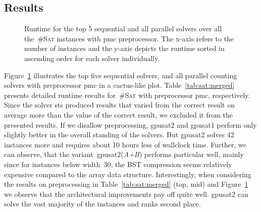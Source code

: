 \documentclass{llncs}
\newcommand{\cSAT}{\textsc{\#Sat}\xspace}%
\newcommand{\gpusatnu}{{\small\textsf{gpusat2}}\xspace}
\newcommand{\gpusatnuv}[1]{{\small\textsf{gpusat2({\textit{#1}})}}\xspace}
\newcommand{\gpusatone}{{\small\textsf{gpusat1}}\xspace}
\begin{document}
\subsection{Results} %
%
%
%
%
%
%
%
%
%
%


\begin{figure}[t]
  \centering
  \caption{Runtime for the top 5 sequential and all parallel solvers over all the~\cSAT instances with pmc preprocessor. %
    The x-axis refers to the number of instances and the y-axis
    depicts the runtime sorted in ascending order for each solver
    individually.  }
  \label{fig:runtime}
\end{figure}
%
Figure~\ref{fig:runtime} illustrates the top five sequential solvers,
and all parallel counting solvers %
%
with preprocessor pmc %
%
in a cactus-like plot. 
Table~\ref{tab:sat:merged} presents detailed runtime
results for~\cSAT with preprocessor pmc, respectively. %
%
%
%
%
%
%
%
%
%
%
%
%
%
%
%
%
Since the solver sts produced results that varied from the correct
result on average more than the value of the correct result, %
%
%
%
%
%
we excluded it from the presented results.  If we disallow
preprocessing, \gpusatnu and \gpusatone perform only slightly better
in the overall standing of the solvers. But \gpusatnu solves 42
instances more and requires about 10 hours less of wallclock
time. Further, we can observe, that %
the variant~\gpusatnuv{A+B} performs particular well, mainly since for
instances below width~30, the BST compression seems relatively
expensive compared to the array data structure.
%
%
%
%
%
Interestingly, when considering the results on preprocessing in
Table~\ref{tab:sat:merged} (top, mid) and Figure~\ref{fig:runtime} we
observe that the architectural improvements pay off quite
well. \gpusatnu can solve the vast majority of the instances and
ranks second place.  
\end{document}
